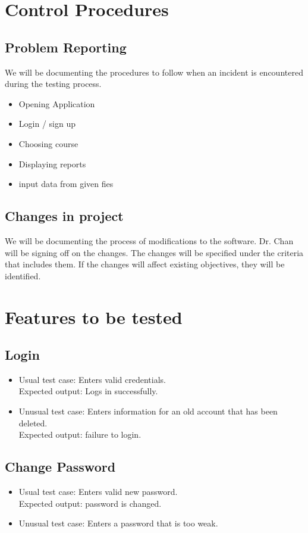 \documentclass[12pt]{article}
\begin{document}
\section{Control Procedures}
\subsection{Problem Reporting}
We will be documenting the procedures to follow when an incident is encountered during the testing process.
\begin{itemize}
	\item Opening Application
	\item Login / sign up
	\item Choosing course
	\item Displaying reports
	\item input data from given fies
\end{itemize}

\subsection{Changes in project}
We will be documenting the process of modifications to the software. Dr. Chan will be signing off on the changes. The changes will be specified under the criteria that includes them. If the changes will affect existing objectives, they will be identified. 

\section{Features to be tested}
\subsection{Login}
\begin{itemize}
	\item Usual test case: Enters valid credentials.\\
Expected output: Logs in successfully.
\item Unusual test case:  Enters information for an old account that has been deleted.\\
		Expected output: failure to login.
\end{itemize}
\subsection{Change Password}
\begin{itemize}
	\item Usual test case: Enters valid new password. \\
Expected output: password is changed.
\item Unusual test case:  Enters a password that is too weak.
\end{itemize}
\end{document}
